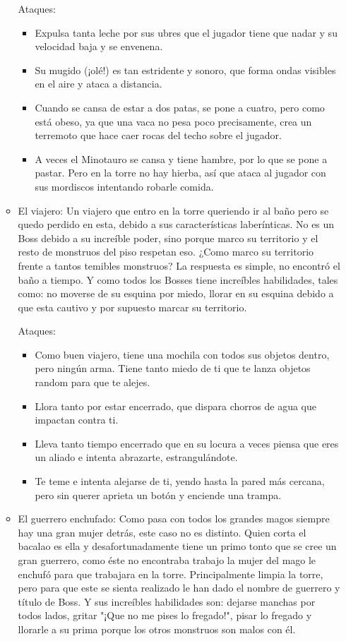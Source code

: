 \begin{itemize}
\begin{itemize}
        Ataques:
        \begin{itemize}
            \item Expulsa tanta leche por sus ubres que el jugador tiene que nadar y su velocidad baja y se envenena.
            \item Su mugido (¡olé!) es tan estridente y sonoro, que forma ondas visibles en el aire y ataca a distancia.
            \item Cuando se cansa de estar a dos patas, se pone a cuatro, pero como está obeso, ya que una vaca no pesa poco precisamente, crea un terremoto que hace caer rocas del techo sobre el jugador.
            \item A veces el Minotauro se cansa y tiene hambre, por lo que se pone a pastar. Pero en la torre no hay hierba, así que ataca al jugador con sus mordiscos intentando robarle comida.
        \end{itemize}
        \item El viajero: Un viajero que entro en la torre queriendo ir al baño pero se quedo perdido en esta, debido a sus características laberínticas. No es un Boss debido a su increíble poder, sino porque marco su territorio y el resto de monstruos del piso respetan eso. ¿Como marco su territorio frente a tantos temibles monstruos? La respuesta es simple, no encontró el baño a tiempo. Y como todos los Bosses tiene increíbles habilidades, tales como: no moverse de su esquina por miedo, llorar en su esquina debido a que esta cautivo y por supuesto marcar su territorio.
        
        Ataques:
        \begin{itemize}
            \item Como buen viajero, tiene una mochila con todos sus objetos dentro, pero ningún arma. Tiene tanto miedo de ti que te lanza objetos random para que te alejes.
            \item Llora tanto por estar encerrado, que dispara chorros de agua que impactan contra ti.
            \item Lleva tanto tiempo encerrado que en su locura a veces piensa que eres un aliado e intenta abrazarte, estrangulándote.
            \item Te teme e intenta alejarse de ti, yendo hasta la pared más cercana, pero sin querer aprieta un botón y enciende una trampa.
        \end{itemize}
        \item El guerrero enchufado: Como pasa con todos los grandes magos siempre hay una gran mujer detrás, este caso no es distinto. Quien corta el bacalao es ella y desafortunadamente tiene un primo tonto que se cree un gran guerrero, como éste no encontraba trabajo la mujer del mago le enchufó para que trabajara en la torre. Principalmente limpia la torre, pero para que este se sienta realizado le han dado el nombre de guerrero y título de Boss. Y sus increíbles habilidades son: dejarse manchas por todos lados, gritar "¡Que no me pises lo fregado!", pisar lo fregado y llorarle a su prima porque los otros monstruos son malos con él.
        

\end{itemize}
\end{itemize}
